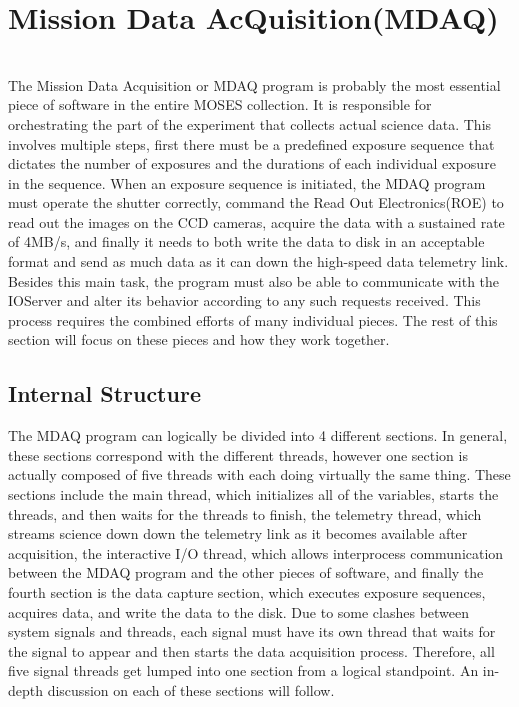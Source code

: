 %
\section{\bf M\rm ission \bf D\rm ata \bf A\rm c\bf Q\rm uisition(MDAQ) }
\hrulefill
\\ 
The Mission Data Acquisition or MDAQ program is probably the most essential
piece of software in the entire MOSES collection. It is responsible for 
orchestrating the part of the experiment that collects actual science data.
This involves multiple steps, first there must be a predefined exposure sequence
that dictates the number of exposures and the durations of each individual exposure
in the sequence. When an exposure sequence is initiated, the MDAQ program must operate
the shutter correctly, command the Read Out Electronics(ROE) to read out the images
on the CCD cameras, acquire the data with a sustained rate of 4MB/s, and finally it needs
to both write the data to disk in an acceptable format and send as much data as it can 
down the high-speed data telemetry link. Besides this main task, the program must also be
able to communicate with the IOServer and alter its behavior according to any such requests
received.
This process requires the combined efforts of 
many individual pieces. The rest of this section will focus on these pieces and how they
work together.

\subsection{Internal Structure}

The MDAQ program can logically be divided into 4 different sections. In general, these sections
correspond with the different threads, however one section is actually composed of five threads
with each doing virtually the same thing. These sections include the main thread, which initializes
all of the variables, starts the threads, and then waits for the threads to finish, the telemetry 
thread, which streams science down down the telemetry link as it becomes available after acquisition,
the interactive I/O thread, which allows interprocess communication between the MDAQ program and the
other pieces of software, and finally the fourth section is the data capture section, which executes
exposure sequences, acquires data, and write the data to the disk. Due to some clashes between system
signals and threads, each signal must have its own thread that waits for the signal to appear and then
starts the data acquisition process. Therefore, all five signal threads get lumped into one section
from a logical standpoint. An in-depth discussion on each of these sections will follow.

